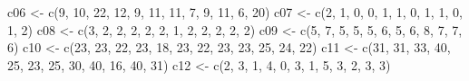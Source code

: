 \documentclass[
]{article}
\newenvironment{Shaded}{\begin{snugshade}}{\end{snugshade}}
\newcommand{\DecValTok}[1]{\textcolor[rgb]{0.00,0.00,0.81}{#1}}
\newcommand{\FunctionTok}[1]{\textcolor[rgb]{0.00,0.00,0.00}{#1}}
\newcommand{\NormalTok}[1]{#1}
\newcommand{\OtherTok}[1]{\textcolor[rgb]{0.56,0.35,0.01}{#1}}
\begin{document}
\begin{Shaded}
\begin{Highlighting}[]
\NormalTok{c06 }\OtherTok{\textless{}{-}} \FunctionTok{c}\NormalTok{(}\DecValTok{9}\NormalTok{, }\DecValTok{10}\NormalTok{, }\DecValTok{22}\NormalTok{, }\DecValTok{12}\NormalTok{, }\DecValTok{9}\NormalTok{, }\DecValTok{11}\NormalTok{, }\DecValTok{11}\NormalTok{, }\DecValTok{7}\NormalTok{, }\DecValTok{9}\NormalTok{, }\DecValTok{11}\NormalTok{, }\DecValTok{6}\NormalTok{, }\DecValTok{20}\NormalTok{)}
\NormalTok{c07 }\OtherTok{\textless{}{-}} \FunctionTok{c}\NormalTok{(}\DecValTok{2}\NormalTok{, }\DecValTok{1}\NormalTok{, }\DecValTok{0}\NormalTok{, }\DecValTok{0}\NormalTok{, }\DecValTok{1}\NormalTok{, }\DecValTok{1}\NormalTok{, }\DecValTok{0}\NormalTok{, }\DecValTok{1}\NormalTok{, }\DecValTok{1}\NormalTok{, }\DecValTok{0}\NormalTok{, }\DecValTok{1}\NormalTok{, }\DecValTok{2}\NormalTok{)}
\NormalTok{c08 }\OtherTok{\textless{}{-}} \FunctionTok{c}\NormalTok{(}\DecValTok{3}\NormalTok{, }\DecValTok{2}\NormalTok{, }\DecValTok{2}\NormalTok{, }\DecValTok{2}\NormalTok{, }\DecValTok{2}\NormalTok{, }\DecValTok{2}\NormalTok{, }\DecValTok{1}\NormalTok{, }\DecValTok{2}\NormalTok{, }\DecValTok{2}\NormalTok{, }\DecValTok{2}\NormalTok{, }\DecValTok{2}\NormalTok{, }\DecValTok{2}\NormalTok{)}
\NormalTok{c09 }\OtherTok{\textless{}{-}} \FunctionTok{c}\NormalTok{(}\DecValTok{5}\NormalTok{, }\DecValTok{7}\NormalTok{, }\DecValTok{5}\NormalTok{, }\DecValTok{5}\NormalTok{, }\DecValTok{5}\NormalTok{, }\DecValTok{6}\NormalTok{, }\DecValTok{5}\NormalTok{, }\DecValTok{6}\NormalTok{, }\DecValTok{8}\NormalTok{, }\DecValTok{7}\NormalTok{, }\DecValTok{7}\NormalTok{, }\DecValTok{6}\NormalTok{)}
\NormalTok{c10 }\OtherTok{\textless{}{-}} \FunctionTok{c}\NormalTok{(}\DecValTok{23}\NormalTok{, }\DecValTok{23}\NormalTok{, }\DecValTok{22}\NormalTok{, }\DecValTok{23}\NormalTok{, }\DecValTok{18}\NormalTok{, }\DecValTok{23}\NormalTok{, }\DecValTok{22}\NormalTok{, }\DecValTok{23}\NormalTok{, }\DecValTok{23}\NormalTok{, }\DecValTok{25}\NormalTok{, }\DecValTok{24}\NormalTok{, }\DecValTok{22}\NormalTok{)}
\NormalTok{c11 }\OtherTok{\textless{}{-}} \FunctionTok{c}\NormalTok{(}\DecValTok{31}\NormalTok{, }\DecValTok{31}\NormalTok{, }\DecValTok{33}\NormalTok{, }\DecValTok{40}\NormalTok{, }\DecValTok{25}\NormalTok{, }\DecValTok{23}\NormalTok{, }\DecValTok{25}\NormalTok{, }\DecValTok{30}\NormalTok{, }\DecValTok{40}\NormalTok{, }\DecValTok{16}\NormalTok{, }\DecValTok{40}\NormalTok{, }\DecValTok{31}\NormalTok{)}
\NormalTok{c12 }\OtherTok{\textless{}{-}} \FunctionTok{c}\NormalTok{(}\DecValTok{2}\NormalTok{, }\DecValTok{3}\NormalTok{, }\DecValTok{1}\NormalTok{, }\DecValTok{4}\NormalTok{, }\DecValTok{0}\NormalTok{, }\DecValTok{3}\NormalTok{, }\DecValTok{1}\NormalTok{, }\DecValTok{5}\NormalTok{, }\DecValTok{3}\NormalTok{, }\DecValTok{2}\NormalTok{, }\DecValTok{3}\NormalTok{, }\DecValTok{3}\NormalTok{)}

\end{Highlighting}
\end{Shaded}
\end{document}
